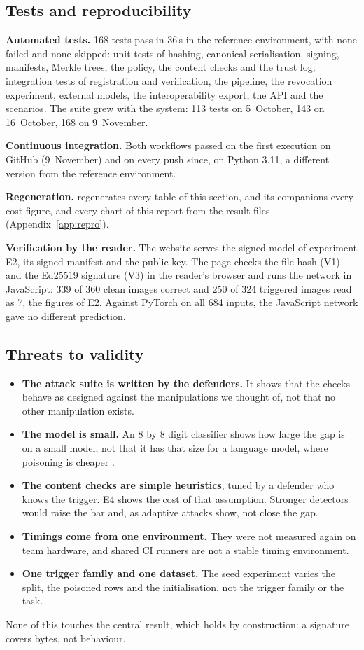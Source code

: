 \subsection{Tests and reproducibility}
\textbf{Automated tests.} 168 tests pass in 36\,s in the reference environment, with none failed and none
skipped: unit tests of hashing, canonical serialisation, signing, manifests, Merkle trees, the policy, the
content checks and the trust log; integration tests of registration and verification, the pipeline, the
revocation experiment, external models, the interoperability export, the API and the scenarios. The suite
grew with the system: 113 tests on 5~October, 143 on 16~October, 168 on 9~November.

\textbf{Continuous integration.} Both workflows passed on the first execution on GitHub (9~November) and on
every push since, on Python 3.11, a different version from the reference environment.

\textbf{Regeneration.}  regenerates every table of this section,
 and its companions every cost figure, and
 every chart of this report from the result files
(Appendix~\ref{app:repro}).

\textbf{Verification by the reader.} The website serves the signed model of experiment E2, its signed manifest
and the public key. The page checks the file hash (V1) and the Ed25519 signature (V3) in the reader's browser
and runs the network in JavaScript: 339 of 360 clean images correct and 250 of 324 triggered images read as 7,
the figures of E2. Against PyTorch on all 684 inputs, the JavaScript network gave no different prediction.

\subsection{Threats to validity}
\begin{itemize}
\item \textbf{The attack suite is written by the defenders.} It shows that the checks behave as designed
  against the manipulations we thought of, not that no other manipulation exists.
\item \textbf{The model is small.} An 8 by 8 digit classifier shows how large the gap is on a small model, not
  that it has that size for a language model, where poisoning is cheaper \cite{souly2025}.
\item \textbf{The content checks are simple heuristics}, tuned by a defender who knows the trigger. E4 shows
  the cost of that assumption. Stronger detectors would raise the bar and, as adaptive attacks show, not close
  the gap.
\item \textbf{Timings come from one environment.} They were not measured again on team hardware, and shared
  CI runners are not a stable timing environment.
\item \textbf{One trigger family and one dataset.} The seed experiment varies the split, the poisoned rows
  and the initialisation, not the trigger family or the task.
\end{itemize}
None of this touches the central result, which holds by construction: a signature covers bytes, not behaviour.
